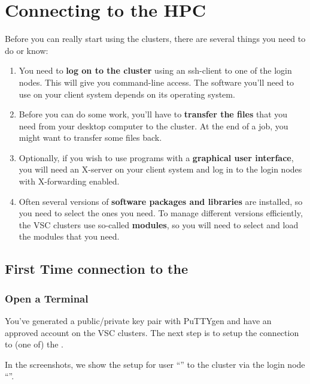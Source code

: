 \chapter{Connecting to the HPC}
\label{ch:preparing-the-environment}

Before you can really start using the \hpc clusters, there are several things you need to do or know:

\begin{enumerate}
\item  You need to \textbf{log on to the cluster} using an ssh-client to one of the login nodes. This will give you command-line access. The software you'll need to use on your client system depends on its operating system.
\item  Before you can do some work, you'll have to \textbf{transfer the files} that you need from your desktop computer to the cluster. At the end of a job, you might want to transfer some files back.
\item  Optionally, if you wish to use programs with a \textbf{graphical user interface}, you will need an X-server on your client system and log in to the login nodes with X-forwarding enabled.
\item  Often several versions of \textbf{software packages and libraries} are installed, so you need to select the ones you need. To manage different versions efficiently, the VSC clusters use so-called \textbf{modules}, so you will need to select and load the modules that you need.
\end{enumerate}

\section{First Time connection to the \hpc}
\label{sec:first-time-connection-to-the-hpc}

\ifwindows

  \subsection{Open a Terminal}
  \label{sec:windows-open-a-terminal}

  You've generated a public/private key pair with PuTTYgen and have an approved
  account on the VSC clusters.  The next step is to setup the connection to (one
  of) the \hpc.

  In the screenshots, we show the setup for user ``''
  to the \hpc cluster via the login node
  ``\strong{\emph{\loginnode}}''.


